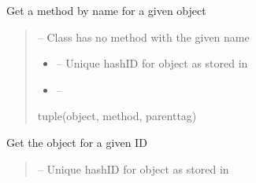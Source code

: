 \documentclass[letterpaper,10pt,english]{sphinxmanual}
\begin{document}
\begin{savenotes}
\begin{fulllineitems}
\begin{savenotes}\begin{fulllineitems}
\label{\detokenize{eezz:eezz.service.TService.get_method}}
\pysigstartsignatures
{}
\pysigstopsignatures
\sphinxAtStartPar
Get a method by name for a given object
\begin{quote}\begin{description}
\sphinxAtStartPar
{} – Class has no method with the given name

\begin{itemize}
\item {} 
\sphinxAtStartPar
{} – Unique hash\sphinxhyphen{}ID for object as stored in {\hyperref[\detokenize{eezz:eezz.service.TService.assign_object}]{}}

\item {} 
\sphinxAtStartPar
{} – 

\end{itemize}

\sphinxAtStartPar
tuple(object, method, parent\sphinxhyphen{}tag)

\end{description}\end{quote}

\end{fulllineitems}\end{savenotes}


\begin{savenotes}\begin{fulllineitems}
\label{\detokenize{eezz:eezz.service.TService.get_object}}
\pysigstartsignatures
{}
\pysigstopsignatures
\sphinxAtStartPar
Get the object for a given ID
\begin{quote}\begin{description}
\sphinxAtStartPar
{} – Unique hash\sphinxhyphen{}ID for object as stored in 


\end{description}
\end{quote}
\end{fulllineitems}
\end{savenotes}
\end{fulllineitems}
\end{savenotes}
\end{document}
